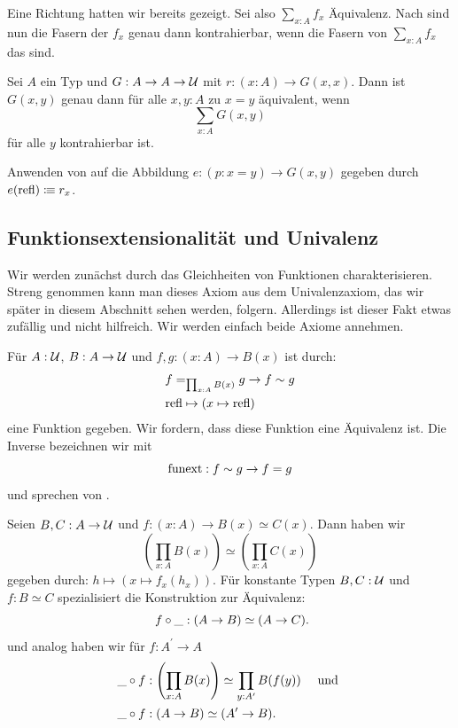 \begin{beweis}
  Eine Richtung hatten wir bereits gezeigt.
  Sei also $\sum_{x:A}f_x$ Äquivalenz.
  Nach  sind nun die Fasern der $f_x$ genau dann kontrahierbar,
  wenn die Fasern von $\sum_{x:A}f_x$ das sind.
\end{beweis}

\begin{satz}
  \label{gleichheitssatz}
  Sei $A$ ein Typ und $G:A\to A\to \mathcal{U}$ mit $r:(x:A)\to G(x,x)$.
  Dann ist $G(x,y)$ genau dann für alle $x,y:A$ zu $x=y$ äquivalent, wenn
  \[
    \sum_{x:A}G(x,y)
  \]
  für alle $y$ kontrahierbar ist.
\end{satz}

\begin{beweis}
  Anwenden von  auf die Abbildung
  $e:(p:x=y)\to G(x,y)$ gegeben durch $e(\mathrm{refl})\vcentcolon\mspace{-1.2mu}\equiv r_x$.
\end{beweis}

\subsection{Funktionsextensionalität und Univalenz}

Wir werden zunächst durch das  Gleichheiten von Funktionen charakterisieren.
Streng genommen kann man dieses Axiom aus dem Univalenzaxiom, das wir später in diesem Abschnitt sehen werden, folgern.
Allerdings ist dieser Fakt etwas zufällig und nicht hilfreich.
Wir werden einfach beide Axiome annehmen.

\begin{axiom}
  Für $A:\mathcal{U}$, $B:A\to\mathcal{U}$ und $f,g:(x:A)\to B(x)$ ist durch:
  \begin{align*}
    &f=_{\prod_{x:A}B(x)}g \to f\sim g \\
    &\mathrm{refl}\mapsto (x\mapsto \mathrm{refl})
  \end{align*}
  eine Funktion gegeben. Wir fordern, dass diese Funktion eine Äquivalenz ist.
  Die Inverse bezeichnen wir mit \[\mathrm{funext}:f\sim g\to f=g\]\index{$\funext$}
  und sprechen von .
\end{axiom}


\begin{lemma}
  Seien $B,C:A\to\mathcal{U}$ und $f:(x:A) \to B(x)\simeq C(x)$.
  Dann haben wir
  \[
     \left(\prod_{x:A}B(x)\right)\simeq \left(\prod_{x:A}C(x)\right)
  \]
  gegeben durch: $h\mapsto (x\mapsto f_x(h_x))$.
  Für konstante Typen $B,C:\mathcal{U}$ und $f:B\simeq C$ spezialisiert die Konstruktion zur Äquivalenz:
  \[
    f\circ\_ : (A\to B) \simeq (A\to C)\rlap{.}
    \]
    und analog haben wir für $f:A^\prime\to A$
    \begin{align*}
    &\_\circ f:\left(\prod_{x:A}B(x)\right)\simeq \prod_{y:A^\prime}B(f(y))\quad\text{ und } \\
    &\_\circ f:(A\to B) \simeq (A'\to B)\rlap{.}    
    \end{align*}
\end{lemma}

